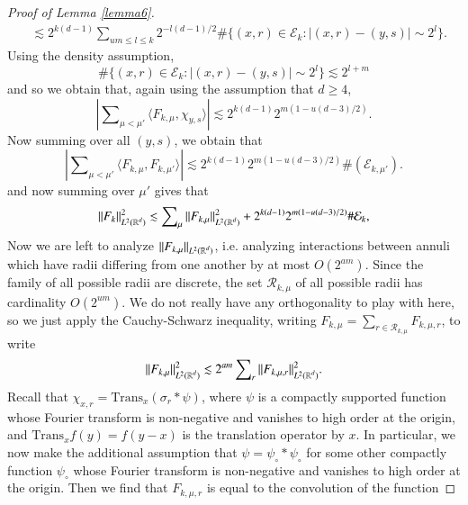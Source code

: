 \begin{proof}[Proof of Lemma \ref{lemma6}]
\begin{equation}
\begin{split}
        &\lesssim 2^{k(d-1)} \sum\nolimits_{um \leq l \leq k} 2^{-l(d-1)/2} \# \{ (x,r) \in \mathcal{E}_k: |(x,r) - (y,s)| \sim 2^l \}.
    \end{split}
    \end{equation}
    Using the density assumption,
    \begin{equation}
      \# \{ (x,r) \in \mathcal{E}_k: |(x,r) - (y,s)| \sim 2^l \} \lesssim 2^{l + m}
    \end{equation}
    and so we obtain that, again using the assumption that $d \geq 4$,
    \begin{equation}
      \left|\sum\nolimits_{\mu < \mu'} \langle F_{k,\mu}, \chi_{y,s} \rangle \right| \lesssim 2^{k(d-1)} 2^{m(1-u(d-3)/2)}.
    \end{equation}
    Now summing over all $(y,s)$, we obtain that
    \begin{equation}
      \left| \sum\nolimits_{\mu < \mu'} \langle F_{k,\mu}, F_{k,\mu'} \rangle \right| \lesssim 2^{k(d-1)} 2^{m(1 - u(d-3)/2)} \#(\mathcal{E}_{k,\mu'}).
    \end{equation}
    and now summing over $\mu'$ gives that
    \begin{equation}
      \| F_k \|_{L^2(\operatorname{\mathbb{R}}^d)}^2 \lesssim \sum\nolimits_\mu \| F_{k,\mu} \|_{L^2(\operatorname{\mathbb{R}}^d)}^2 + 2^{k(d-1)} 2^{m(1 - u(d-3)/2)} \# \mathcal{E}_k,
    \end{equation}
    Now we are left to analyze $\| F_{k,\mu} \|_{L^2(\operatorname{\mathbb{R}}^d)}$, i.e. analyzing interactions between annuli which have radii differing from one another by at most $O(2^{am})$. Since the family of all possible radii are discrete, the set $\mathcal{R}_{k,\mu}$ of all possible radii has cardinality $O(2^{um})$. We do not really have any orthogonality to play with here, so we just apply the Cauchy-Schwarz inequality, writing $F_{k,\mu} = \sum\nolimits_{r \in \mathcal{R}_{k,\mu}} F_{k,\mu,r}$, to write
    \begin{equation}
      \| F_{k,\mu} \|_{L^2(\operatorname{\mathbb{R}}^d)}^2 \lesssim 2^{am} \sum\nolimits_r \| F_{k,\mu,r} \|_{L^2(\operatorname{\mathbb{R}}^d)}^2.
    \end{equation}
    Recall that $\chi_{x,r} = \text{Trans}_x(\sigma_r * \psi)$, where $\psi$ is a compactly supported function whose Fourier transform is non-negative and vanishes to high order at the origin, and $\text{Trans}_x f(y) = f(y - x)$ is the translation operator by $x$. In particular, we now make the additional assumption that $\psi = \psi_{\circ} * \psi_{\circ}$ for some other compactly function $\psi_{\circ}$ whose Fourier transform is non-negative and vanishes to high order at the origin. Then we find that $F_{k,\mu,r}$ is equal to the convolution of the function

\end{proof}
